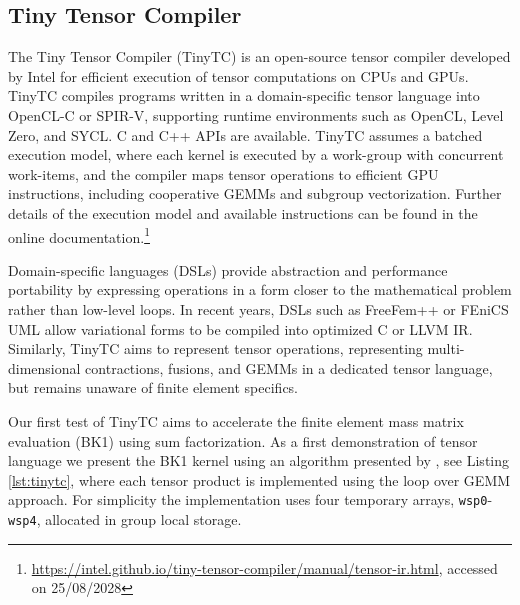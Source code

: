 \documentclass[a4paper,12pt]{article}
\begin{document}
\subsection{Tiny Tensor Compiler}

\label{sec:tinytc}

The Tiny Tensor Compiler (TinyTC) is an open-source tensor compiler developed by Intel for efficient execution of tensor computations on CPUs and GPUs. TinyTC compiles programs written in a domain-specific tensor language into OpenCL-C or SPIR-V, supporting runtime environments such as OpenCL, Level Zero, and SYCL. C and C++ APIs are available. TinyTC assumes a batched execution model, where each kernel is executed by a work-group with concurrent work-items, and the compiler maps tensor operations to efficient GPU instructions, including cooperative GEMMs and subgroup vectorization. Further details of the execution model and available instructions can be found in the online documentation.\footnote{\url{https://intel.github.io/tiny-tensor-compiler/manual/tensor-ir.html}, accessed on 25/08/2028}

Domain-specific languages (DSLs) provide abstraction and performance portability by expressing operations in a form closer to the mathematical problem rather than low-level loops. In recent years, DSLs such as FreeFem++ or FEniCS UML allow variational forms to be compiled into optimized C or LLVM IR. Similarly, TinyTC aims to represent tensor operations, representing multi-dimensional contractions, fusions, and GEMMs in a dedicated tensor language, but remains unaware of finite element specifics.

Our first test of TinyTC aims to accelerate the finite element mass matrix evaluation (BK1) using sum factorization. As a first demonstration of tensor language we present the BK1 kernel using an algorithm presented by \cite{Swirydowicz19}, see Listing \ref{lst:tinytc}, where each tensor product is implemented using the loop over GEMM approach. For simplicity the implementation uses four temporary arrays, \texttt{wsp0}-\texttt{wsp4}, allocated in group local storage.
\end{document}
